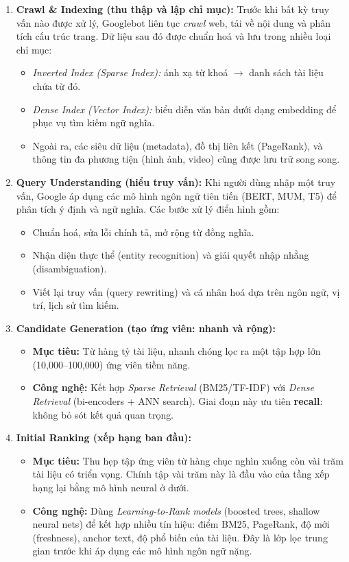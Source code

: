 \begin{enumerate}
	\item \textbf{Crawl \& Indexing (thu thập và lập chỉ mục):}
	Trước khi bất kỳ truy vấn nào được xử lý, Googlebot liên tục \emph{crawl} web, tải về nội dung và phân tích cấu trúc trang. Dữ liệu sau đó được chuẩn hoá và lưu trong nhiều loại chỉ mục:
	\begin{itemize}
		\item \emph{Inverted Index (Sparse Index):} ánh xạ từ khoá $\rightarrow$ danh sách tài liệu chứa từ đó.
		\item \emph{Dense Index (Vector Index):} biểu diễn văn bản dưới dạng embedding để phục vụ tìm kiếm ngữ nghĩa.
		\item Ngoài ra, các siêu dữ liệu (metadata), đồ thị liên kết (PageRank), và thông tin đa phương tiện (hình ảnh, video) cũng được lưu trữ song song.
	\end{itemize}
	
	\item \textbf{Query Understanding (hiểu truy vấn):}
	Khi người dùng nhập một truy vấn, Google áp dụng các mô hình ngôn ngữ tiên tiến (BERT, MUM, T5) để phân tích ý định và ngữ nghĩa. Các bước xử lý điển hình gồm:
	\begin{itemize}
		\item Chuẩn hoá, sửa lỗi chính tả, mở rộng từ đồng nghĩa.
		\item Nhận diện thực thể (entity recognition) và giải quyết nhập nhằng (disambiguation).
		\item Viết lại truy vấn (query rewriting) và cá nhân hoá dựa trên ngôn ngữ, vị trí, lịch sử tìm kiếm.
	\end{itemize}
	
	\item \textbf{Candidate Generation (tạo ứng viên: nhanh và rộng):}
	\begin{itemize}
		\item \textbf{Mục tiêu:} Từ hàng tỷ tài liệu, nhanh chóng lọc ra một tập hợp lớn (10,000--100,000) ứng viên tiềm năng.
		\item \textbf{Công nghệ:} Kết hợp \emph{Sparse Retrieval} (BM25/TF-IDF) với \emph{Dense Retrieval} (bi-encoders + ANN search). Giai đoạn này ưu tiên \textbf{recall}: không bỏ sót kết quả quan trọng.
	\end{itemize}

	\item \textbf{Initial Ranking (xếp hạng ban đầu):}
	\begin{itemize}
		\item \textbf{Mục tiêu:} Thu hẹp tập ứng viên từ hàng chục nghìn xuống còn vài trăm tài liệu có triển vọng. Chính tập vài trăm này là đầu vào của tầng xếp hạng lại bằng mô hình neural ở dưới.
		\item \textbf{Công nghệ:} Dùng \emph{Learning-to-Rank models} (boosted trees, shallow neural nets) để kết hợp nhiều tín hiệu: điểm BM25, PageRank, độ mới (freshness), anchor text, độ phổ biến của tài liệu. Đây là lớp lọc trung gian trước khi áp dụng các mô hình ngôn ngữ nặng.
	\end{itemize}


\end{enumerate}

